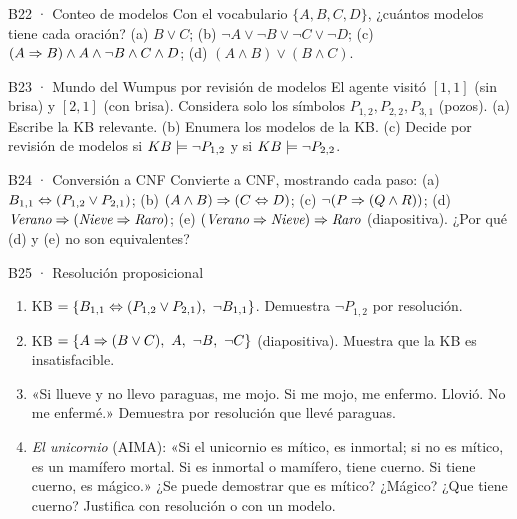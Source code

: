 \begin{ejercicio}{B22 · Conteo de modelos }
Con el vocabulario $\{A,B,C,D\}$, ¿cuántos modelos tiene cada oración?
(a) $B\vee C$; (b) $\neg A\vee\neg B\vee\neg C\vee\neg D$; (c) $(A\Rightarrow B)\wedge A\wedge\neg B\wedge C\wedge D$;
(d) $(A\wedge B)\vee(B\wedge C)$.
\end{ejercicio}

\begin{ejercicio}{B23 · Mundo del Wumpus por revisión de modelos }
El agente visitó $[1,1]$ (sin brisa) y $[2,1]$ (con brisa). Considera solo los símbolos
$P_{1,2},P_{2,2},P_{3,1}$ (pozos).
(a) Escribe la KB relevante. (b) Enumera los modelos de la KB. (c) Decide por revisión de modelos si
$KB\models\neg P_{1,2}$ y si $KB\models\neg P_{2,2}$.
\end{ejercicio}

\begin{ejercicio}{B24 · Conversión a CNF }
Convierte a CNF, mostrando cada paso:
(a) $B_{1,1}\Leftrightarrow(P_{1,2}\vee P_{2,1})$; (b) $(A\wedge B)\Rightarrow(C\Leftrightarrow D)$; (c) $\neg(P\Rightarrow(Q\wedge R))$;
(d) $\textit{Verano}\Rightarrow(\textit{Nieve}\Rightarrow\textit{Raro})$; (e) $(\textit{Verano}\Rightarrow\textit{Nieve})\Rightarrow\textit{Raro}$ (diapositiva). ¿Por qué (d) y (e) no son equivalentes?
\end{ejercicio}

\begin{ejercicio}{B25 · Resolución proposicional }
\begin{enumerate}[label=(\alph*)]
\item KB $=\{B_{1,1}\Leftrightarrow(P_{1,2}\vee P_{2,1}),\ \neg B_{1,1}\}$. Demuestra $\neg P_{1,2}$ por resolución.
\item KB $=\{A\imp(B\vee C),\ A,\ \neg B,\ \neg C\}$ (diapositiva). Muestra que la KB es insatisfacible.
\item «Si llueve y no llevo paraguas, me mojo. Si me mojo, me enfermo. Llovió. No me enfermé.»
Demuestra por resolución que llevé paraguas.
\item \emph{El unicornio} (AIMA): «Si el unicornio es mítico, es inmortal; si no es mítico, es un
mamífero mortal. Si es inmortal o mamífero, tiene cuerno. Si tiene cuerno, es mágico.» ¿Se puede
demostrar que es mítico? ¿Mágico? ¿Que tiene cuerno? Justifica con resolución o con un modelo.
\end{enumerate}
\end{ejercicio}


